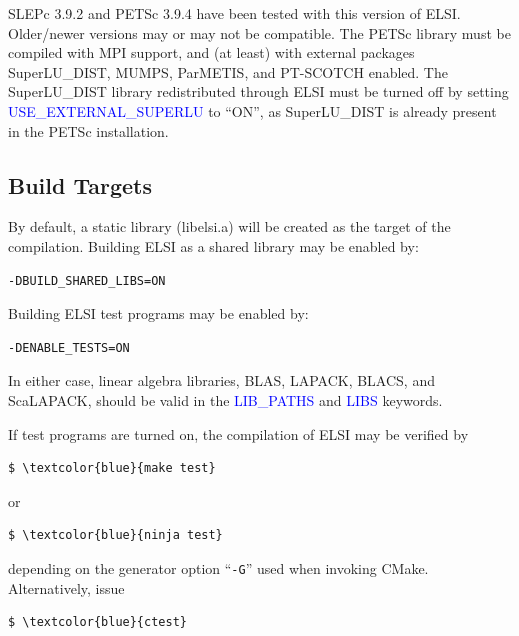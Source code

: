 \documentclass{report}
\begin{document}
SLEPc 3.9.2 and PETSc 3.9.4 have been tested with this version of ELSI.  Older/newer versions may or may not be compatible.  The PETSc library must be compiled with MPI support, and (at least) with external packages SuperLU\_DIST, MUMPS, ParMETIS, and PT-SCOTCH enabled.  The SuperLU\_DIST library redistributed through ELSI must be turned off by setting \textcolor{blue}{USE\_EXTERNAL\_SUPERLU} to ``ON'', as SuperLU\_DIST is already present in the PETSc installation.

\subsection{Build Targets}
\label{subsec:config_targets}
By default, a static library (libelsi.a) will be created as the target of the compilation.  Building ELSI as a shared library may be enabled by:
\begin{tcolorbox}
\begin{verbatim}
-DBUILD_SHARED_LIBS=ON
\end{verbatim}
\end{tcolorbox}

Building ELSI test programs may be enabled by:
\begin{tcolorbox}
\begin{verbatim}
-DENABLE_TESTS=ON
\end{verbatim}
\end{tcolorbox}

In either case, linear algebra libraries, BLAS, LAPACK, BLACS, and ScaLAPACK, should be valid in the \textcolor{blue}{LIB\_PATHS} and \textcolor{blue}{LIBS} keywords.

If test programs are turned on, the compilation of ELSI may be verified by
\begin{tcolorbox}
\begin{Verbatim}[commandchars=\\\{\}]
$ \textcolor{blue}{make test}
\end{Verbatim}
\end{tcolorbox}

or
\begin{tcolorbox}
\begin{Verbatim}[commandchars=\\\{\}]
$ \textcolor{blue}{ninja test}
\end{Verbatim}
\end{tcolorbox}

depending on the generator option ``\verb+-G+'' used when invoking CMake.  Alternatively, issue
\begin{tcolorbox}
\begin{Verbatim}[commandchars=\\\{\}]
$ \textcolor{blue}{ctest}
\end{Verbatim}
\end{tcolorbox}
\end{document}
